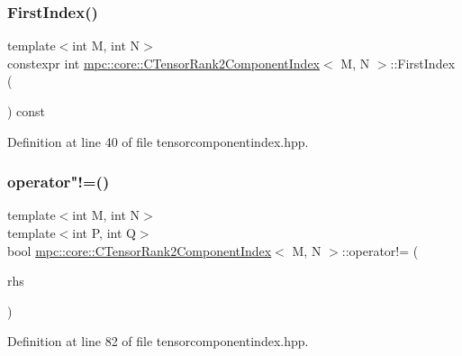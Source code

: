 \subsubsection{\texorpdfstring{First\+Index()}{FirstIndex()}}
{\footnotesize\ttfamily template$<$int M, int N$>$ \\
constexpr int \mbox{\hyperlink{classmpc_1_1core_1_1_c_tensor_rank2_component_index}{mpc\+::core\+::\+C\+Tensor\+Rank2\+Component\+Index}}$<$ M, N $>$\+::First\+Index (\begin{DoxyParamCaption}{ }\end{DoxyParamCaption}) const\hspace{0.3cm}{\ttfamily [inline]}}



Definition at line 40 of file tensorcomponentindex.\+hpp.

\mbox{\label{classmpc_1_1core_1_1_c_tensor_rank2_component_index_a052391422fa03b261456a51ddbd388d8}} 
\subsubsection{\texorpdfstring{operator"!=()}{operator!=()}}
{\footnotesize\ttfamily template$<$int M, int N$>$ \\
template$<$int P, int Q$>$ \\
bool \mbox{\hyperlink{classmpc_1_1core_1_1_c_tensor_rank2_component_index}{mpc\+::core\+::\+C\+Tensor\+Rank2\+Component\+Index}}$<$ M, N $>$\+::operator!= (\begin{DoxyParamCaption}\item[{const \mbox{\hyperlink{classmpc_1_1core_1_1_c_tensor_rank2_component_index}{C\+Tensor\+Rank2\+Component\+Index}}$<$ P, Q $>$ \&}]{rhs }\end{DoxyParamCaption})\hspace{0.3cm}{\ttfamily [inline]}}



Definition at line 82 of file tensorcomponentindex.\+hpp.

\mbox{\label{classmpc_1_1core_1_1_c_tensor_rank2_component_index_a376fbe0ee4fd0e934d5d06b5370e1b96}} 
